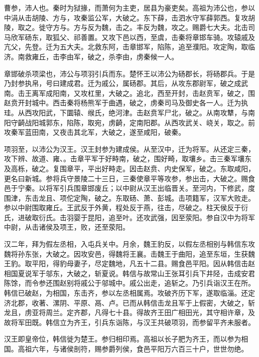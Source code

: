 \documentclass[12pt,UTF8]{ctexbook}
\begin{document}
曹参，沛人也。秦时为狱掾，而萧何为主吏，居县为豪吏矣。高祖为沛公也，参以中涓从击胡陵、方与，攻秦监公军，大破之。东下薛，击泗水守军薛郭西。复攻胡陵，取之。徙守方与。方与反为魏，击之。丰反为魏，攻之。赐爵七大夫。北击司马欣军砀东，取狐父、祁善置。又攻下邑以西，至虞，击秦将章邯车骑。攻辕戚及亢父，先登。迁为五大夫。北救东阿，击章邯军，陷陈，追至濮阳。攻定陶，取临济。南救雍丘，击李由军，破之，杀李由，虏秦候一人。



章邯破杀项梁也，沛公与项羽引兵而东。楚怀王以沛公为砀郡长，将砀郡兵。于是乃封参执帛，号曰建成君。迁为戚公，属砀郡。其后，从攻东郡尉军，破之成武南。击王离军成阳南，又攻杠里，大破之。追北，西至开封，击赵贲军，破之，围赵贲开封城中。西击秦将杨熊军于曲遇，破之，虏秦司马及御史各一人。迁为执珪。从西攻阳武，下圜辕、缑氏，绝河津。击赵贲军尸北，破之。从南攻犨，与南阳守齮战阳城郭东，陷陈，取宛，虏齮，定南阳郡。从西攻武关、峣关，取之。前攻秦军蓝田南，又夜击其北军，大破之，遂至咸阳，破秦。



项羽至，以沛公为汉王。汉王封参为建成侯。从至汉中，迁为将军。从还定三秦，攻下辨、故道、雍、。击章平军于好畤南，破之，围好畸，取壤乡。击三秦军壤东及高栎，破之。复围章平，平出好畤走。因击赵贲、内史保军，破之。东取咸阳，更名曰新城。参将兵守景陵二十三日，三秦使章平等攻参，参出击，大破之。赐食邑于宁秦。以将军引兵围章邯废丘；以中尉从汉王出临晋关。至河内，下修武，度围津，东击龙且、项佗定陶，破之。东取砀、萧、彭城。击项籍军，汉军大败走。参以中尉围取雍丘。王武反于外黄，程处反于燕，往击，尽破之。柱天侯反于衍氏，进破取衍氏。击羽婴于昆阳，追至叶。还攻武强，因至荥阳。参自汉中为将军中尉，从击诸侯及项王，败，还至荥阳。



汉二年，拜为假左丞相，入屯兵关中。月余，魏王豹反，以假左丞相别与韩信东攻魏将孙东张，大破之。因攻安邑，得魏将王襄。击魏王于曲阳，追至东垣，生获魏王豹。取平阳，得豹母妻子，尽定魏地，凡五十二县。赐食邑平阳。因从韩信击赵相国夏说军于邬东，大破之，斩夏说。韩信与故常山王张耳引兵下井陉，击成安君陈馀，而令参还围赵别将戚公于邬城中。戚公出走，追斩之。乃引兵诣汉王在所。韩信已破赵，为相国，东击齐，参以左丞相属焉。攻破齐历下军，遂取临淄。还定济北郡，收著、漯阴、平原、鬲、卢。已而从韩信击龙且军于上假密，大破之，斩龙且，虏亚将周兰。定齐郡，凡得七十县。得故齐王田广相田光，其守相许章，及故将军田既。韩信立为齐王，引兵东诣陈，与汉王共破项羽，而参留平齐未服者。



汉王即皇帝位，韩信徙为楚王。参归相印焉。高祖以长子肥为齐王，而以参为相国。高祖六年，与诸侯剖符，赐参爵列侯，食邑平阳万六百三十户，世世勿绝。
\end{document}
